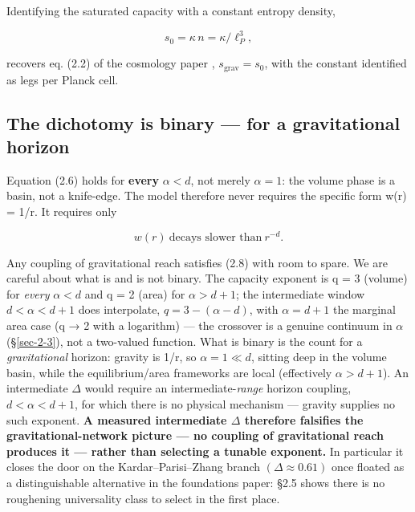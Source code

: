 \documentclass[12pt]{iopart}
\begin{document}
Identifying the saturated capacity with a constant entropy density,

\[s_0 = \kappa\, n = \kappa/\ell_P^3, \tag{2.7}\]

recovers eq. (2.2) of the cosmology paper \citep{Pandev:2026cosmology},
\(s_{\mathrm{grav}} = s_{0}\), with the constant identified as legs per
Planck cell.

\subsection{The dichotomy is binary --- for a gravitational
horizon}\label{sec-2-4}

Equation (2.6) holds for \textbf{every} \(\alpha  < d\), not merely
\(\alpha  = 1\): the volume phase is a basin, not a knife-edge. The
model therefore never requires the specific form w(r) = 1/r. It requires
only

\[w(r)\ \text{decays slower than}\ r^{-d}. \tag{2.8}\]

Any coupling of gravitational reach satisfies (2.8) with room to spare.
We are careful about what is and is not binary. The capacity exponent is
q = 3 (volume) for \emph{every} \(\alpha  < d\) and q = 2 (area) for
\(\alpha  > d+1\); the intermediate window \(d < \alpha  < d+1\) does
interpolate, \(q = 3 - (\alpha  - d)\), with \(\alpha  = d+1\) the
marginal area case (q → 2 with a logarithm) --- the crossover is a
genuine continuum in \(\alpha\) (§\ref{sec-2-3}), not a two-valued
function. What is binary is the count for a \emph{gravitational}
horizon: gravity is 1/r, so \(\alpha  = 1 \ll  d\), sitting deep in the
volume basin, while the equilibrium/area frameworks are local
(effectively \(\alpha  > d+1\)). An intermediate \(\Delta\) would
require an intermediate-\emph{range} horizon coupling,
\(d < \alpha  < d+1\), for which there is no physical mechanism ---
gravity supplies no such exponent. \textbf{A measured intermediate
\(\Delta\) therefore falsifies the gravitational-network picture --- no
coupling of gravitational reach produces it --- rather than selecting a
tunable exponent.} In particular it closes the door on the
Kardar--Parisi--Zhang branch \((\Delta  \approx  0.61)\) once floated as
a distinguishable alternative in the foundations paper: §2.5 shows there
is no roughening universality class to select in the first place.
\end{document}
